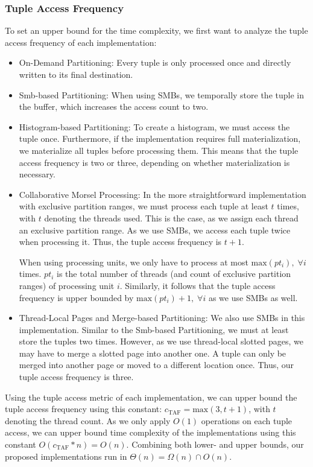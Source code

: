 \subsubsection{Tuple Access Frequency}
To set an upper bound for the time complexity, we first want to analyze the tuple access frequency of each implementation:
\begin{itemize}
  \item On-Demand Partitioning: Every tuple is only processed once and directly written to its final destination.
  \item Smb-based Partitioning: When using \acp{SMB}, we temporally store the tuple in the buffer, which increases the access count to two.
  \item Histogram-based Partitioning: To create a histogram, we must access the tuple once.
        Furthermore, if the implementation requires full materialization, we materialize all tuples before processing them.
        This means that the tuple access frequency is two or three, depending on whether materialization is necessary.

  \item Collaborative Morsel Processing: In the more straightforward implementation with exclusive partition ranges, we must process each tuple at least $t$ times, with $t$ denoting the threads used.
        This is the case, as we assign each thread an exclusive partition range.
        As we use \acp{SMB}, we access each tuple twice when processing it.
        Thus, the tuple access frequency is $t + 1$.

        When using processing units, we only have to process at most $\textrm{max}(pt_i), \; \forall i$ times.
        $pt_i$ is the total number of threads (and count of exclusive partition ranges) of processing unit $i$.
        Similarly, it follows that the tuple access frequency is upper bounded by $\textrm{max}(pt_i) + 1, \; \forall i$ as we use \acp{SMB} as well.

  \item Thread-Local Pages and Merge-based Partitioning: We also use \acp{SMB} in this implementation.
        Similar to the Smb-based Partitioning, we must at least store the tuples two times.
        However, as we use thread-local slotted pages, we may have to merge a slotted page into another one.
        A tuple can only be merged into another page or moved to a different location once.
        Thus, our tuple access frequency is three.
\end{itemize}
Using the tuple access metric of each implementation, we can upper bound the tuple access frequency using this constant: $c_\textrm{TAF} = \textrm{max}(3, t+1)$, with $t$ denoting the thread count.
As we only apply $O(1)$ operations on each tuple access, we can upper bound time complexity of the implementations using this constant $O(c_\textrm{TAF} * n) = O(n)$.
Combining both lower- and upper bounds, our proposed implementations run in $\Theta(n) = \Omega(n) \cap O(n) $.
